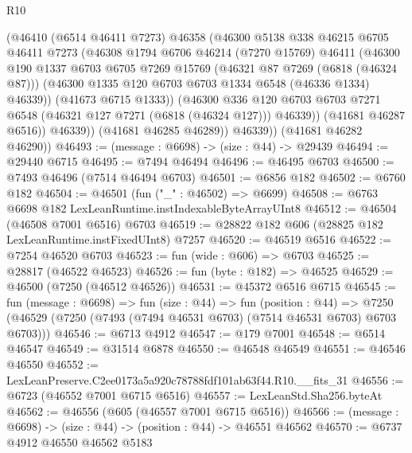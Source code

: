 \begin{lexlean}{R10}
\begin{coremodule}
                (@46410
                  (@6514 @46411 @7273)
                  @46358
                  (@46300
                    @5138
                    @338
                    @46215
                    @6705
                    @46411
                    @7273
                    (@46308
                      @1794
                      @6706
                      @46214
                      (@7270 @15769)
                      @46411
                      (@46300
                        @190
                        @1337
                        @6703
                        @6705
                        @7269
                        @15769
                        (@46321 @87 @7269 (@6818 (@46324 @87)))
                        (@46300 @1335 @120 @6703 @6703 @1334 @6548 (@46336 @1334) @46339))
                      (@41673 @6715 @1333))
                    (@46300
                      @336
                      @120
                      @6703
                      @6703
                      @7271
                      @6548
                      (@46321 @127 @7271 (@6818 (@46324 @127)))
                      @46339))
                  (@41681 @46287 @6516))
                @46339))
            (@41681 @46285 @46289))
          @46339))
      (@41681 @46282 @46290))
@46493 := (message : @6698) -> (size : @44) -> @29439
@46494 := @29440 @6715
@46495 := @7494 @46494
@46496 := @46495 @6703
@46500 := @7493 @46496 (@7514 @46494 @6703)
@46501 := @6856 @182
@46502 := @6760 @182
@46504 := @46501 (fun ("_" : @46502) => @6699)
@46508 := @6763 @6698 @182 LexLeanRuntime.instIndexableByteArrayUInt8
@46512 := @46504 (@46508 @7001 @6516) @6703
@46519 := @28822 @182 @606 (@28825 @182 LexLeanRuntime.instFixedUInt8) @7257
@46520 := @46519 @6516
@46522 := @7254 @46520 @6703
@46523 := fun (wide : @606) => @6703
@46525 := @28817 (@46522 @46523)
@46526 := fun (byte : @182) => @46525
@46529 := @46500 (@7250 (@46512 @46526))
@46531 := @45372 @6516 @6715
@46545 := fun (message : @6698) =>
  fun (size : @44) =>
  fun (position : @44) =>
  @7250 (@46529 (@7250 (@7493 (@7494 @46531 @6703) (@7514 @46531 @6703) @6703 @6703)))
@46546 := @6713 @4912
@46547 := @179 @7001
@46548 := @6514 @46547
@46549 := @31514 @6878
@46550 := @46548 @46549
@46551 := @46546 @46550
@46552 := LexLeanPreserve.C2ee0173a5a920c78788fdf101ab63f44.R10.__fits_31
@46556 := @6723 (@46552 @7001 @6715 @6516)
@46557 := LexLeanStd.Sha256.byteAt
@46562 := @46556 (@605 (@46557 @7001 @6715 @6516))
@46566 := (message : @6698) -> (size : @44) -> (position : @44) -> @46551 @46562
@46570 := @6737 @4912 @46550 @46562 @5183

\end{coremodule}
\end{lexlean}
